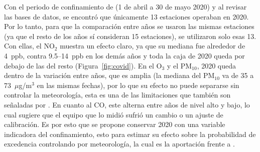 \documentclass[11pt]{article}
\begin{document}
Con el periodo de confinamiento de \citet{schiavo2023} (1 de abril a 30 de mayo 2020) y al revisar las bases de datos, se encontró que únicamente 13 estaciones operaban en 2020. Por lo tanto, para que la comparación entre años se usaron las mismas estaciones (ya que el resto de los años sí consideran 15 estaciones), se utilizaron solo esas 13. Con ellas, el NO$_2$ muestra un efecto claro, ya que su mediana fue alrededor de 4~ppb, contra 9.5--14~ppb en los demás años y toda la caja de 2020 queda por debajo de las del resto (Figura~\ref{fig:covid}). En el O$_3$ y el PM$_{10}$, 2020 queda dentro de la variación entre años, que es amplia (la mediana del PM$_{10}$ va de 35 a 73~$\mu$g/m$^3$ en las mismas fechas), por lo que su efecto no puede separarse sin controlar la meteorología, esta es una de las limitaciones que también son señaladas por \citet{schiavo2023}. En cuanto al CO, este alterna entre años de nivel alto y bajo, lo cual sugiere que el equipo que lo midió sufrió un cambio o un ajuste de calibración. Es por esto que se propone conservar 2020 con una variable indicadora del confinamiento, esto para estimar su efecto sobre la probabilidad de excedencia controlando por meteorología, la cual es la aportación frente a \citet{schiavo2023}. 
 
\end{document}
